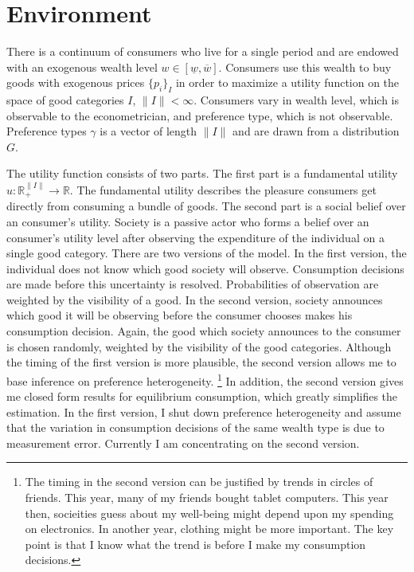 \documentclass{article}
\begin{document}
\section{Environment}
There is a continuum of consumers who live for a single period and are endowed with an exogenous wealth level $w \in \left[ \underline{w},\overline{w} \right]$.
Consumers use this wealth to buy goods with exogenous prices $\{p_i\}_I$ in order to maximize a utility function on the space of good categories $I$, $\|I\|<\infty$. 
Consumers vary in wealth level, which is observable to the econometrician, and preference type, which is not observable.
Preference types $\gamma$ is a vector of length $\|I\|$ and are drawn from a distribution $G$.

The utility function consists of two parts.  The first part is a fundamental utility $u:\mathbb{R}_+^{\|I\|}\rightarrow\mathbb{R}$.
The fundamental utility describes the pleasure consumers get directly from consuming a bundle of goods.
The second part is a social belief over an consumer's utility.  
Society is a passive actor who forms a belief over an consumer's utility level after observing the expenditure of the individual on a single good category. 
There are two versions of the model.
In the first version, the individual does not know which good society will observe. 
Consumption decisions are made before this uncertainty is resolved.
Probabilities of observation are weighted by the visibility of a good.
In the second version, society announces which good it will be observing before the consumer chooses makes his consumption decision. 
Again, the good which society announces to the consumer is chosen randomly, weighted by the visibility of the good categories.
Although the timing of the first version is more plausible, the second version allows me to base inference on preference heterogeneity.
\footnote{The timing in the second version can be justified by trends in circles of friends.  This year, many of my friends bought tablet computers.  This year then, socieities guess about my well-being might depend upon my spending on electronics.  In another year, clothing might be more important.  The key point is that I know what the trend is before I make my consumption decisions.} 
In addition, the second version gives me closed form results for equilibrium consumption, which greatly simplifies the estimation.
In the first version, I shut down preference heterogeneity and assume that the variation in consumption decisions of the same wealth type is due to measurement error.
Currently I am concentrating on the second version.
\end{document}
